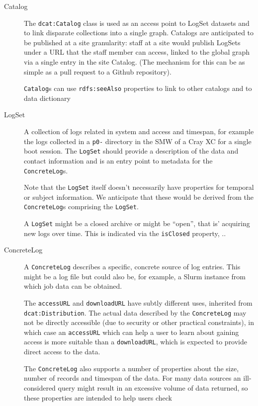 \begin{description}
\item[Catalog] \hfill

The \texttt{dcat:Catalog} class is used as an access point to LogSet datasets and 
to link disparate collections into a single graph. Catalogs are anticipated to be 
published at a site granularity: staff at a site would publish LogSets under
a URL that the staff member can access, linked to the global graph via a single 
entry in the site Catalog. (The mechanism for this can be as simple as a pull
request to a Github repository).

\texttt{Catalog}s can use \texttt{rdfs:seeAlso} properties to link to other 
catalogs and to data dictionary

\item[LogSet] \hfill

A collection of logs related in system and access and timespan,
for example the logs collected in a \texttt{p0-} directory in the SMW of a Cray
XC for a single boot session. The \texttt{LogSet} should provide a description
of the data and contact information and is an entry point to metadata for 
the \texttt{ConcreteLog}s.

Note that the \texttt{LogSet} itself doesn't necessarily have properties for 
temporal or subject information. We anticipate that these would be derived 
from the \texttt{ConcreteLog}s comprising the \texttt{LogSet}.

A \texttt{LogSet} might be a closed archive or might be ``open'', that is' 
acquiring new logs over time. This is indicated via the \texttt{isClosed} 
property, ..

\item[ConcreteLog] \hfill

A \texttt{ConcreteLog} describes a specific, concrete source of log entries.
This might be a log file but could also be, for example, a Slurm instance
from which job data can be obtained. 

The \texttt{accessURL} and \texttt{downloadURL} have subtly different uses,
inherited from \texttt{dcat:Distribution}. The actual data described by the 
\texttt{ConcreteLog} may not be directly accessible (due to security or 
other practical constraints), in which case an \texttt{accessURL} which 
can help a user to learn about gaining access is more suitable than a 
\texttt{downloadURL}, which is expected to provide direct access to the 
data.


The \texttt{ConcreteLog} also supports a number of properties about the
size, number of records and timespan of the data. For many data sources 
an ill-considered query might result in an excessive volume of data returned,
so these properties are intended to help users check 



\end{description}

